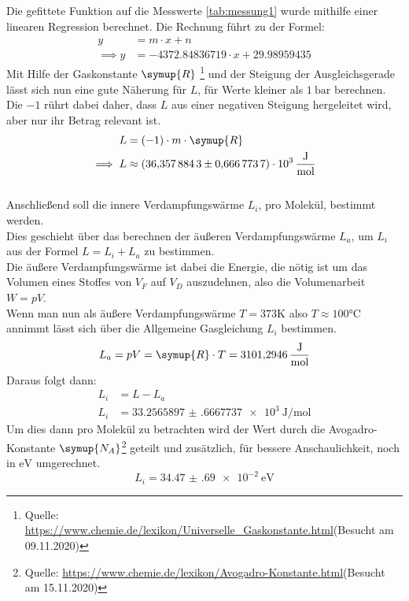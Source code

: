 Die gefittete Funktion auf die Messwerte \ref{tab:messung1} wurde mithilfe einer linearen Regression berechnet.
Die Rechnung führt zu der Formel:
\begin{align}
    y&=m\cdot x+n \nonumber\\
    \implies y&=-4372.84836719 \cdot x+29.98959435 \nonumber
\end{align}
Mit Hilfe der Gaskonstante $\symup{R}$   \footnote{Quelle: \url{https://www.chemie.de/lexikon/Universelle_Gaskonstante.html}(Besucht am 09.11.2020)}
und der Steigung der Ausgleichsgerade lässt sich nun eine gute Näherung für $L$, für Werte kleiner als $\SI{1}{\bar}$ berechnen.
Die $-1$ rührt dabei daher, dass $L$ aus einer negativen Steigung hergeleitet wird, aber nur ihr Betrag relevant ist.
\begin{align}
    L&=(-1) \cdot m \cdot \symup{R} \nonumber\\
    \implies L&\approx\SI{36.3578843(6667737)e3}{\joule\per\mol} \nonumber
\end{align}\\
Anschließend soll die innere Verdampfungswärme $L_i$, pro Molekül, bestimmt werden.\\
Dies geschieht über das berechnen der äußeren Verdampfungswärme $L_a$, um $L_i$ aus der Formel $L=L_i+L_a$ zu bestimmen.\\
Die äußere Verdampfungswärme ist dabei die Energie, die nötig ist um das Volumen eines Stoffes von $V_F$ auf $V_D$ auszudehnen,
also die Volumenarbeit $W=pV$.\\
Wenn man nun als äußere Verdampfungswärme $T=373 \si{\kelvin}$ also $T\approx 100 \si{\celsius}$ annimmt lässt sich über die Allgemeine Gasgleichung $L_i$ bestimmen.
\begin{equation}
    L_a=pV=\symup{R} \cdot T = \SI{3101.2946}{\joule\per\mol} \nonumber
\end{equation}
Daraus folgt dann:
\begin{align}
    L_i&=L-L_a \nonumber\\
    L_i&=\SI{33.2565897(6667737)e3}{\joule\per\mol} \nonumber
\end{align}
Um dies dann pro Molekül zu betrachten wird der Wert durch die Avogadro-Konstante $\symup{N_A}$\footnote{Quelle: \url{https://www.chemie.de/lexikon/Avogadro-Konstante.html}(Besucht am 15.11.2020)}
geteilt und zusätzlich, für bessere Anschaulichkeit,
noch in $\si{\electronvolt}$ umgerechnet.
\begin{equation}
    L_i=\SI{34.47(69)e-2}{\electronvolt} \nonumber
\end{equation}

